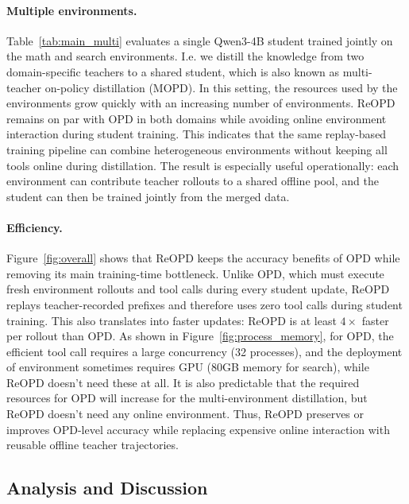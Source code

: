 \paragraph{Multiple environments.}
Table~\ref{tab:main_multi} evaluates a single Qwen3-4B student trained jointly on the math and search environments. I.e. we distill the knowledge from two domain-specific teachers to a shared student, which is also known as multi-teacher on-policy distillation (MOPD). In this setting, the resources used by the environments grow quickly with an increasing number of environments. ReOPD remains on par with OPD in both domains while avoiding online environment interaction during student training. This indicates that the same replay-based training pipeline can combine heterogeneous environments without keeping all tools online during distillation. The result is especially useful operationally: each environment can contribute teacher rollouts to a shared offline pool, and the student can then be trained jointly from the merged data.

\paragraph{Efficiency.}
Figure~\ref{fig:overall} shows that ReOPD keeps the accuracy benefits of OPD while removing its main training-time bottleneck. Unlike OPD, which must execute fresh environment rollouts and tool calls during every student update, ReOPD replays teacher-recorded prefixes and therefore uses zero tool calls during student training. This also translates into faster updates: ReOPD is at least $4\times$ faster per rollout than OPD. As shown in Figure~\ref{fig:process_memory}, for OPD, the efficient tool call requires a large concurrency (32 processes), and the deployment of environment sometimes requires GPU (80GB memory for search), while ReOPD doesn't need these at all. It is also predictable that the required resources for OPD will increase  for the multi-environment distillation, but ReOPD doesn't need any online environment. Thus, ReOPD preserves or improves OPD-level accuracy while replacing expensive online interaction with reusable offline teacher trajectories. 


\subsection{Analysis and Discussion}
